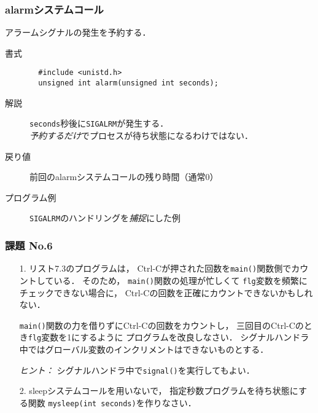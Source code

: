 \documentclass{beamer}                 %
\begin{document}
\begin{frame}[fragile]
  \frametitle{alarmシステムコール}
  アラームシグナルの発生を予約する．

  \begin{description}
  \item[書式]
\begin{verbatim}
  #include <unistd.h>
  unsigned int alarm(unsigned int seconds);
\end{verbatim}

  \item[解説]
    \texttt{seconds}秒後に\texttt{SIGALRM}が発生する．\\
    \emph{予約するだけ}でプロセスが待ち状態になるわけではない．

  \item[戻り値]
    前回のalarmシステムコールの残り時間（通常0）
  
  \item[プログラム例] \texttt{SIGALRM}のハンドリングを\emph{捕捉}にした例
  \end{description}
\end{frame}

\begin{frame}[fragile]
  \frametitle{課題 No.6}
  \begin{enumerate}
  \item[1.] リスト7.3のプログラムは，
    Ctrl-Cが押された回数を\texttt{main()}関数側でカウントしている．
    そのため，
    \texttt{main()}関数の処理が忙しくて
    \texttt{flg}変数を頻繁にチェックできない場合に，
    Ctrl-Cの回数を正確にカウントできないかもしれない．
  
    \texttt{main()}関数の力を借りずにCtrl-Cの回数をカウントし，
    三回目のCtrl-Cのとき\texttt{flg}変数を1にするように
    プログラムを改良しなさい．
    シグナルハンドラ中ではグローバル変数のインクリメントはできないものとする．

    \emph{ヒント：} シグナルハンドラ中で\texttt{signal()}を実行してもよい．

  \item[2.] sleepシステムコールを用いないで，
    指定秒数プログラムを待ち状態にする関数
    \texttt{mysleep(int seconds)}を作りなさい．
  \end{enumerate}
\end{frame}
\end{document}

